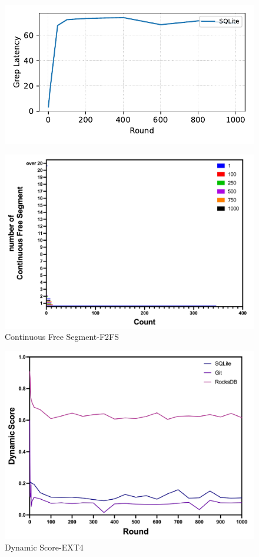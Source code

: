 \begin{figure}[t]
    \centering
    \includegraphics[width=0.95\columnwidth]{graphs/py_graph/latency-f2fs}
    \caption{}
    \label{f:f2fs_latency}
\end{figure}


\begin{figure}[t]
    \centering
	\includegraphics[width=0.95\columnwidth]{graphs/continuous_free_segment_fsfs}
	\caption{Continuous Free Segment-F2FS}
	\label{f:continuous_free_segment_fsfs}
\end{figure}

\begin{figure}[t]
    \centering
	\includegraphics[width=0.95\columnwidth]{graphs/ext4_dynamic}
	\caption{Dynamic Score-EXT4}
	\label{f:ext4_dynamic}
\end{figure}


